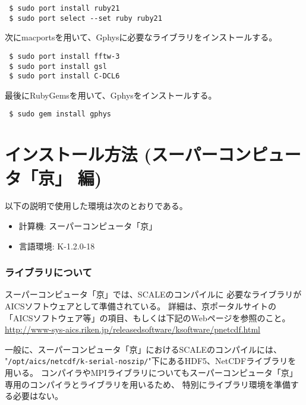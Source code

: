 \begin{verbatim}
 $ sudo port install ruby21
 $ sudo port select --set ruby ruby21
\end{verbatim}

次にmacportsを用いて、Gphysに必要なライブラリをインストールする。

\begin{verbatim}
 $ sudo port install fftw-3
 $ sudo port install gsl
 $ sudo port install C-DCL6
\end{verbatim}

最後にRubyGemsを用いて、Gphysをインストールする。

\begin{verbatim}
 $ sudo gem install gphys
\end{verbatim}



\section{インストール方法 (スーパーコンピュータ「京」 編)} \label{chap:install_supercom}

以下の説明で使用した環境は次のとおりである。
\begin{itemize}
\item 計算機: スーパーコンピュータ「京」
\item 言語環境: K-1.2.0-18
\end{itemize}

\subsubsection{ライブラリについて}
スーパーコンピュータ「京」では、SCALEのコンパイルに
必要なライブラリがAICSソフトウェアとして準備されている。
詳細は、京ポータルサイトの「AICSソフトウェア等」の項目、もしくは下記のWebページを参照のこと。\\
\noindent \url{http://www-sys-aics.riken.jp/releasedsoftware/ksoftware/pnetcdf.html}

一般に、スーパーコンピュータ「京」におけるSCALEのコンパイルには、\\
\noindent "\verb|/opt/aics/netcdf/k-serial-noszip/|"下にあるHDF5、NetCDFライブラリを用いる。
コンパイラやMPIライブラリについてもスーパーコンピュータ「京」専用のコンパイラとライブラリを用いるため、
特別にライブラリ環境を準備する必要はない。



